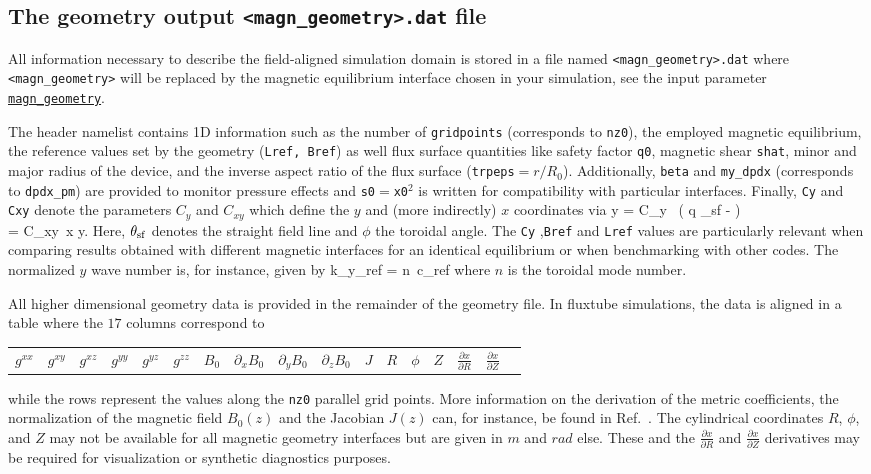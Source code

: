 \documentclass[12pt]{article}
\begin{document}
\subsection{The geometry output \texttt{<magn\_geometry>.dat} file}
\label{subsec:geometry-file}

All information necessary to describe the field-aligned simulation domain is stored in a file
named \texttt{<magn\_geometry>.dat} where {\tt <magn\_geometry>} will be replaced by the
magnetic equilibrium interface chosen in your simulation, see the input parameter
\hyperlink{magn_geometry}{\tt magn\_geometry}.

The header namelist contains 1D information such as the number of {\tt gridpoints} (corresponds to {\tt nz0}),
the employed magnetic equilibrium, the reference values set by the geometry ({\tt Lref, Bref})
as well flux surface quantities like safety factor {\tt q0}, magnetic shear {\tt shat},
minor and major radius of the device, and the inverse aspect ratio of the flux surface ({\tt trpeps}$=r/R_0$).
Additionally, {\tt beta} and {\tt my\_dpdx}
(corresponds to {\tt dpdx\_pm}) are provided to monitor pressure effects and {\tt s0}$=${\tt x0}$^2$ is
written for compatibility with particular interfaces.
Finally, {\tt Cy} and {\tt Cxy} denote the parameters $C_y$ and $C_{xy}$ which define the $y$ and
(more indirectly) $x$ coordinates via
\bea
y = C_y \, \left( q \theta_{\rm sf} - \phi\right)\\
 = C_{xy}\, \nabla x \times \nabla y.
\eea
Here, $\theta_{\rm sf}$ denotes the straight field line and $\phi$ the toroidal angle. The {\tt Cy}
,{\tt Bref} and {\tt Lref} values are particularly relevant when comparing \gene results
obtained with different magnetic interfaces for an identical equilibrium or when benchmarking with other codes.
The normalized $y$ wave number is, for instance, given by
\bea
k_y\rho_{\rm ref} = n\, c_{\rm ref} 
\eea
where $n$ is the toroidal mode number.

All higher dimensional geometry data is provided in the remainder of the geometry file.
In fluxtube simulations, the data is aligned in a table where the $17$ columns correspond to
\begin{center}
\scriptsize
\begin{tabular}{ccccccccccccccccc}
$g^{xx}$ & $g^{xy}$ & $g^{xz}$ & $g^{yy}$ & $g^{yz}$ & $g^{zz}$ & $B_0$ & $\partial_x B_0$ & $\partial_y B_0$ &
$\partial_z B_0$ & $J$ & $R$ & $\phi$ & $Z$ & $\frac{\partial x}{\partial R}$ & $\frac{\partial x}{\partial Z}$
\end{tabular}
\end{center}
while the rows represent the values along the {\tt nz0} parallel grid points. More information
on the derivation of the metric coefficients, the normalization of the magnetic field $B_0(z)$ and the Jacobian
$J(z)$ can, for instance, be found in Ref.~\cite{ToldPhD}. The cylindrical coordinates $R$, $\phi$, and $Z$
may not be available for all magnetic geometry interfaces but are given in $m$ and $rad$ else.
These and the $\frac{\partial x}{\partial R}$ and $\frac{\partial x}{\partial Z}$ derivatives may be
required for visualization or synthetic diagnostics purposes.
\end{document}
